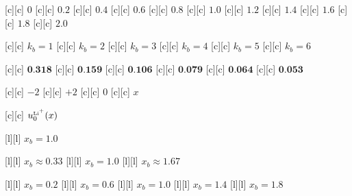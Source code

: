  [c][c] {\tiny $0$}
 [c][c] {\tiny $0.2$}
 [c][c] {\tiny $0.4$}
 [c][c] {\tiny $0.6$}
 [c][c] {\tiny $0.8$}
[c][c] {\tiny $1.0$}
[c][c] {\tiny $1.2$}
[c][c] {\tiny $1.4$}
[c][c] {\tiny $1.6$}
[c][c] {\tiny $1.8$}
[c][c] {\tiny $2.0$}



[c][c] {$k_{b} = 1$}
[c][c] {$k_{b} = 2$}
[c][c] {$k_{b} = 3$}
[c][c] {$k_{b} = 4$}
[c][c] {$k_{b} = 5$}
[c][c] {$k_{b} = 6$}

[c][c] {\tiny $\textbf{0.318}$}
[c][c] {\tiny $\textbf{0.159}$}
[c][c] {\tiny $\textbf{0.106}$}
[c][c] {\tiny $\textbf{0.079}$}
[c][c] {\tiny $\textbf{0.064}$}
[c][c] {\tiny $\textbf{0.053}$}

[c][c] {\tiny $-2$}
[c][c] {\tiny $+2$}
[c][c]   {\tiny $0$}
[c][c]   {\tiny $x$}

[c][c]  {\tiny $u_{0}^{\text{\tiny Li}^{\tiny +}}(x)$}

[l][l] {\tiny $x_{b} = 1.0$}

[l][l] {\tiny $x_{b} \approx 0.33$}
[l][l] {\tiny $x_{b} = 1.0$}
[l][l] {\tiny $x_{b} \approx 1.67$}

[l][l] {\tiny $x_{b} = 0.2$}
[l][l] {\tiny $x_{b} = 0.6$}
[l][l] {\tiny $x_{b} = 1.0$}
[l][l] {\tiny $x_{b} = 1.4$}
[l][l] {\tiny $x_{b} = 1.8$}

